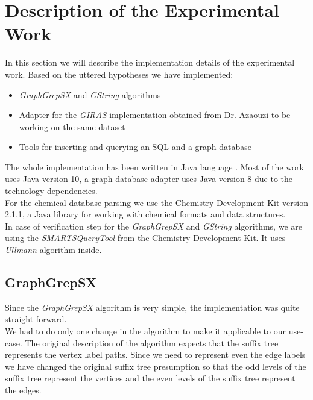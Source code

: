 \section{Description of the Experimental Work}

In this section we will describe the implementation details of the experimental work. Based on the uttered hypotheses we have implemented:

\begin{itemize}
	\item \textit{GraphGrepSX} and \textit{GString} algorithms
	
	\item Adapter for the \textit{GIRAS} implementation obtained from Dr. Azaouzi to be working on the same dataset
	
	\item Tools for inserting and querying an SQL and a graph database
\end{itemize}

The whole implementation has been written in Java language \cite{java}. Most of the work uses Java version 10, a graph database adapter uses Java version 8 due to the technology dependencies.\\

For the chemical database parsing we use the Chemistry Development Kit \cite{CDK} version 2.1.1, a Java library for working with chemical formats and data structures.\\

In case of verification step for the \textit{GraphGrepSX} and \textit{GString} algorithms, we are using the \textit{SMARTSQueryTool} from the Chemistry Development Kit. It uses \textit{Ullmann} \cite{Ullmann} algorithm inside.

\subsection{GraphGrepSX} \label{graphgrep-implementation}

Since the \textit{GraphGrepSX} algorithm is very simple, the implementation was quite straight-forward.\\

We had to do only one change in the algorithm to make it applicable to our use-case. The original description of the algorithm expects that the suffix tree represents the vertex label paths. Since we need to represent even the edge labels we have changed the original suffix tree presumption so that the odd levels of the suffix tree represent the vertices and the even levels of the suffix tree represent the edges.\\


